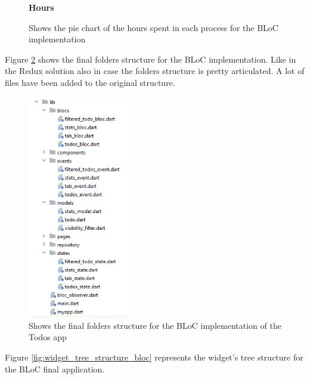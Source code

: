 \begin{figure}[H]
 \caption*{\textbf{Hours}}
\centering
{}
 \caption{Shows the pie chart of the hours spent in each process for the BLoC implementation}
 \label{image:bloc_hours_piechart}
\end{figure}

Figure \ref{fig:struttura_cartelle_bloc} shows the final folders structure for the BLoC implementation. Like in the Redux solution also in case the folders structure is pretty articulated. A lot of files have been added to the original structure.

\begin{figure}[H]
    \centering
    \includegraphics[width=0.4\textwidth]{Images/struttura_cartelle_bloc.png}
    \caption{Shows the final folders structure for the BLoC implementation of the Todos app}
    \label{fig:struttura_cartelle_bloc}
\end{figure}
Figure \ref{fig:widget_tree_structure_bloc}  represents the widget's tree structure for the BLoC final application. 

